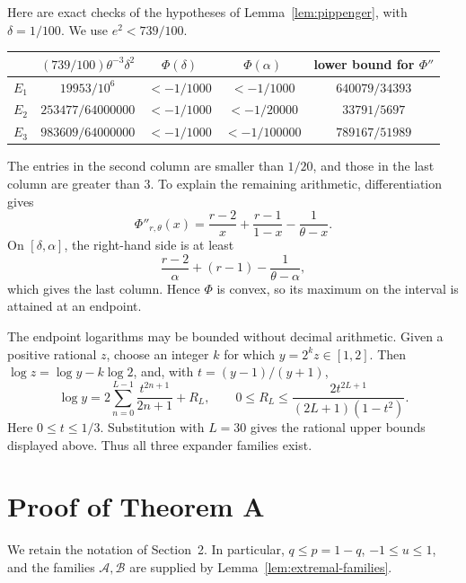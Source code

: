 \documentclass[11pt,a4paper]{amsart}
\newcommand{\cA}{\mathcal A}
\newcommand{\cB}{\mathcal B}
\begin{document}
Here are exact checks of the hypotheses of Lemma~\ref{lem:pippenger}, with
\(\delta=1/100\).  We use \(e^2<739/100\).
\begin{center}
\small
\begin{tabular}{c c c c c}
\toprule
 & \((739/100)\theta^{-3}\delta^2\) &
 \(\Phi(\delta)\) & \(\Phi(\alpha)\) & lower bound for \(\Phi''\)\\
\midrule
\(E_1\) & \(19953/10^6\) & \(<-1/1000\) & \(<-1/1000\) &
\(640079/34393\)\\
\(E_2\) & \(253477/64000000\) & \(<-1/1000\) & \(<-1/20000\) &
\(33791/5697\)\\
\(E_3\) & \(983609/64000000\) & \(<-1/1000\) & \(<-1/100000\) &
\(789167/51989\)\\
\bottomrule
\end{tabular}
\end{center}
The entries in the second column are smaller than \(1/20\), and those in the
last column are greater than \(3\).  To explain the remaining arithmetic,
differentiation gives
\begin{equation}\label{eq:Phi-second}
 \Phi''_{r,\theta}(x)
 =\frac{r-2}{x}+\frac{r-1}{1-x}-\frac1{\theta-x}.
\end{equation}
On \([\delta,\alpha]\), the right-hand side is at least
\[
 \frac{r-2}{\alpha}+(r-1)-\frac1{\theta-\alpha},
\]
which gives the last column.  Hence \(\Phi\) is convex, so its maximum on
the interval is attained at an endpoint.

The endpoint logarithms may be bounded without decimal arithmetic.  Given a
positive rational \(z\), choose an integer \(k\) for which
\(y=2^kz\in[1,2]\).  Then \(\log z=\log y-k\log2\), and, with
\(t=(y-1)/(y+1)\),
\[
 \log y=2\sum_{n=0}^{L-1}\frac{t^{2n+1}}{2n+1}+R_L,
 \qquad
 0\leqslant R_L\leqslant
 \frac{2t^{2L+1}}{(2L+1)(1-t^2)}.
\]
Here \(0\leqslant t\leqslant1/3\).  Substitution with \(L=30\) gives the
rational upper bounds displayed above.  Thus all three expander
families exist.

\section{Proof of Theorem A}

We retain the notation of Section~2.  In particular, \(q\leqslant p=1-q\),
\(-1\leqslant u\leqslant1\), and the families \(\cA,\cB\) are supplied by
Lemma~\ref{lem:extremal-families}.
\end{document}
